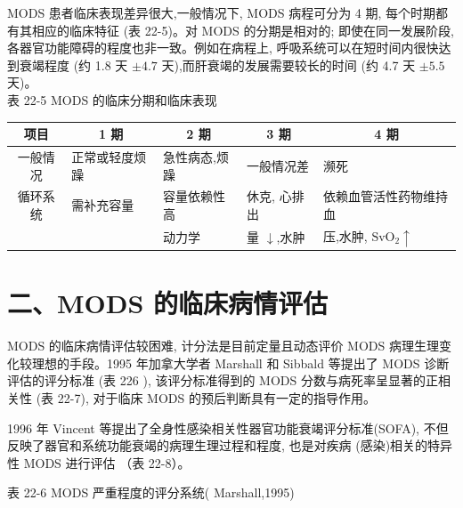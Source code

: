 \documentclass[10pt]{article}
\begin{document}
MODS 患者临床表现差异很大,一般情况下, MODS 病程可分为 4 期, 每个时期都有其相应的临床特征 (表 22-5)。对 MODS 的分期是相对的; 即使在同一发展阶段, 各器官功能障碍的程度也非一致。例如在病程上, 呼吸系统可以在短时间内很快达到衰竭程度 (约 1.8 天 $\pm 4.7$ 天),而肝衰竭的发展需要较长的时间 (约 4.7 天 $\pm 5.5$ 天)。\\
表 22-5 MODS 的临床分期和临床表现

\begin{center}
\begin{tabular}{cllll}
\hline
\multicolumn{1}{c}{项目} & \multicolumn{1}{c}{1 期} & \multicolumn{1}{c}{2 期} & \multicolumn{1}{c}{3 期} & \multicolumn{1}{c}{4 期} \\
\hline
一般情况 & 正常或轻度烦躁 & 急性病态,烦躁 & 一般情况差 & 濒死 \\
循环系统 & 需补充容量 & 容量依赖性高 & 休克, 心排出 & 依赖血管活性药物维持血 \\
 &  & 动力学 & 量 $\downarrow$,水肿 & 压,水肿, $\mathrm{SvO}_{2} \uparrow$ \\
\end{tabular}
\end{center}

\section*{二、MODS 的临床病情评估}
MODS 的临床病情评估较困难, 计分法是目前定量且动态评价 MODS 病理生理变化较理想的手段。1995 年加拿大学者 Marshall 和 Sibbald 等提出了 MODS 诊断评估的评分标准 (表 226 ), 该评分标准得到的 MODS 分数与病死率呈显著的正相关性 (表 22-7), 对于临床 MODS 的预后判断具有一定的指导作用。

1996 年 Vincent 等提出了全身性感染相关性器官功能衰竭评分标准(SOFA), 不但反映了器官和系统功能衰竭的病理生理过程和程度, 也是对疾病 (感染)相关的特异性 MODS 进行评估 （表 22-8）。

表 22-6 MODS 严重程度的评分系统( Marshall,1995)
\end{document}
